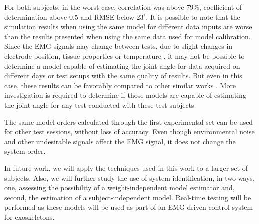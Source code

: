 \documentclass[letterpaper, 10 pt, conference]{ieeeconf}  %
\begin{document}



For both subjects, in the worst case, correlation was above $79\%$, coefficient of determination above $0.5$ and RMSE below $23^\circ$. It is possible to note that the simulation results when using the same model for different data inputs are worse than the results presented when using the same data used for model calibration. Since the EMG signals may change between tests, due to slight changes in electrode position, tissue properties or temperature \cite{soderberg1975}, it may not be possible to determine a model capable of estimating the joint angle for data acquired on different days or test setups with the same quality of results. But even in this case, these results can be favorably compared to other similar works \cite{Rahmatian2016158,Mamikoglu2016785,Pang2015165,Liu1999391}. More investigation is required to determine if those models are capable of estimating the joint angle for any test conducted with these test subjects.

The same model orders calculated through the first experimental set can be used for other test sessions, without loss of accuracy. Even though environmental noise and other undesirable signals affect the EMG signal, it does not change the system order.

In future work, we will apply the techniques used in this work to a larger set of subjects. Also, we will further study the use of system identification, in two ways, one, assessing the possibility of a weight-independent model estimator and, second, the estimation of a subject-independent model. Real-time testing will be performed as these models will be used as part of an EMG-driven control system for exoskeletons.





\end{document}
